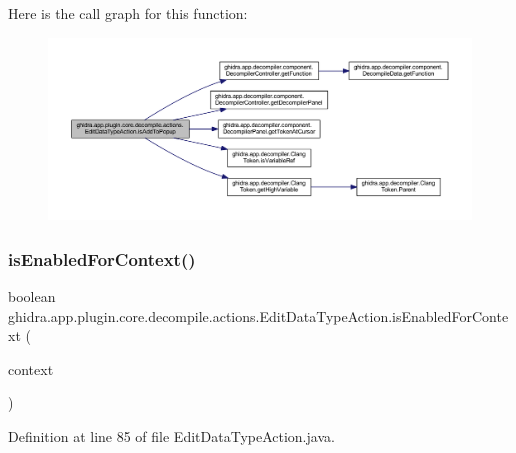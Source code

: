 Here is the call graph for this function\+:
\nopagebreak
\begin{figure}[H]
\begin{center}
\leavevmode
\includegraphics[width=350pt]{classghidra_1_1app_1_1plugin_1_1core_1_1decompile_1_1actions_1_1_edit_data_type_action_a3740c7acec5cdd01522f8d5bb6696a36_cgraph}
\end{center}
\end{figure}
\mbox{\label{classghidra_1_1app_1_1plugin_1_1core_1_1decompile_1_1actions_1_1_edit_data_type_action_a12994abff238287eec91cc98cc89d219}} 
\subsubsection{\texorpdfstring{isEnabledForContext()}{isEnabledForContext()}}
{\footnotesize\ttfamily boolean ghidra.\+app.\+plugin.\+core.\+decompile.\+actions.\+Edit\+Data\+Type\+Action.\+is\+Enabled\+For\+Context (\begin{DoxyParamCaption}\item[{Action\+Context}]{context }\end{DoxyParamCaption})\hspace{0.3cm}{\ttfamily [inline]}}



Definition at line 85 of file Edit\+Data\+Type\+Action.\+java.

